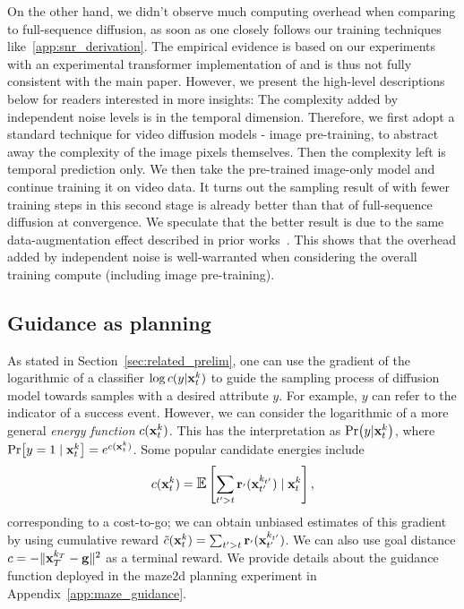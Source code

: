 On the other hand, we didn't observe much computing overhead when comparing \algo{} to full-sequence diffusion, as soon as one closely follows our training techniques like~\ref{app:snr_derivation}. The empirical evidence is based on our experiments with an experimental transformer implementation of \algo{} and is thus not fully consistent with the main paper. However, we present the high-level descriptions below for readers interested in more insights: The complexity added by independent noise levels is in the temporal dimension. Therefore, we first adopt a standard technique for video diffusion models - image pre-training, to abstract away the complexity of the image pixels themselves. Then the complexity left is temporal prediction only. We then take the pre-trained image-only model and continue training it on video data. It turns out the sampling result of \algo{} with fewer training steps in this second stage is already better than that of full-sequence diffusion at convergence. We speculate that the better result is due to the same data-augmentation effect described in prior works~\cite{kingma2024understanding}. This shows that the overhead added by independent noise is well-warranted when considering the overall training compute (including image pre-training). 


\subsection{Guidance as planning}
\label{app:reward_guidance}
As stated in Section~\ref{sec:related_prelim}, one can use the gradient of the logarithmic of a classifier $\log c(y|\mathbf{x}_t^k)$ to guide the sampling process of diffusion model towards samples with a desired attribute $y$. For example, $y$ can refer to the indicator of a success event.  However, we can consider the logarithmic of a more general \emph{energy function} $c(\mathbf{x}_t^k)$. This has the interpretation as $\Pr(y | \mathbf{x}_t^k)$, where $\Pr[ y= 1 \mid \mathbf{x}_t^k] = e^{c(\mathbf{x}_t^k)}$. Some popular candidate energies include
\begin{align}
    c(\bx_t^k) =\Exp\left[\sum_{t' > t} \br_{'}(\bx_{t'}^{k_{t'}}) \mid \bx_t^{k}\right],  \label{eq:cost_to_go_guidance}
\end{align}
corresponding to a cost-to-go; we can obtain unbiased estimates of this gradient by using cumulative reward $\tilde  c(\mathbf{x}_t^k) =\sum_{t' > t} \mathbf{r}_{'}(\mathbf{x}_{t'}^{k_{t'}})$. We can also use goal distance $c = - \|\mathbf{x}_T^{k_T} - \mathbf{g}\|^2$ as a terminal reward. We provide details about the guidance function deployed in the maze2d planning experiment in Appendix~\ref{app:maze_guidance}.



